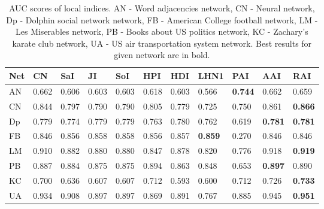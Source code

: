\documentclass{llncs}
\begin{document}
\begin{table}
\begin{center}
\caption{AUC scores of local indices. AN - Word adjacencies network\cite{adjnoun-net}, CN - Neural network\cite{celneur-net}, Dp - Dolphin social network network\cite{dolph-net}, FB - American College football network\cite{foot-net}, LM - Les Miserables network\cite{lesmis-net}, PB - Books about US politics network\cite{polbook-net}, KC - Zachary's karate club network\cite{karate-net}, UA - US air transportation system network\cite{usair-net}. Best results for given network are in bold.}
\begin{tabular}{| l | l | l | l | l | l | l | l | l | l | l |}
\hline
Net & CN & SaI & JI & SoI & HPI & HDI & LHN1 & PAI & AAI & RAI \\ \hline
AN & 0.662 & 0.606 & 0.603 & 0.603 & 0.618 & 0.603 & 0.566 & \textbf{0.744} & 0.662 & 0.659 \\ \hline
CN & 0.844 & 0.797 & 0.790 & 0.790 & 0.805 & 0.779 & 0.725 & 0.750 & 0.861 & \textbf{0.866} \\ \hline
Dp & 0.779 & 0.774 & 0.779 & 0.779 & 0.763 & 0.780 & 0.762 & 0.619 & \textbf{0.781} & \textbf{0.781} \\ \hline
FB & 0.846 & 0.856 & 0.858 & 0.858 & 0.856 & 0.857 & \textbf{0.859} & 0.270 & 0.846 & 0.846 \\ \hline
LM & 0.910 & 0.882 & 0.880 & 0.880 & 0.847 & 0.878 & 0.820 & 0.776 & 0.918 & \textbf{0.919} \\ \hline
PB & 0.887 & 0.884 & 0.875 & 0.875 & 0.894 & 0.863 & 0.848 & 0.653 & \textbf{0.897} & 0.890 \\ \hline
KC & 0.700 & 0.636 & 0.607 & 0.607 & 0.712 & 0.593 & 0.600 & 0.712 & 0.726 & \textbf{0.733} \\ \hline
UA & 0.934 & 0.908 & 0.897 & 0.897 & 0.869 & 0.891 & 0.767 & 0.885 & 0.945 & \textbf{0.951} \\ 
\hline
\end{tabular}
\end{center}
\end{table}
%
\setlength{\tabcolsep}{5pt}
\renewcommand{\arraystretch}{1.5}
\end{document}
